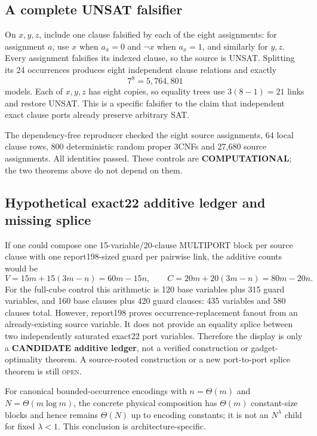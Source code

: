 \documentclass[11pt]{article}
\newcommand{\OPEN}{\textsc{open}}
\begin{document}
\subsection{A complete UNSAT falsifier}
On $x,y,z$, include one clause falsified by each of the eight assignments:
for assignment $a$, use $x$ when $a_x=0$ and $\neg x$ when $a_x=1$, and
similarly for $y,z$.  Every assignment falsifies its indexed clause, so the
source is UNSAT.  Splitting its 24 occurrences produces eight independent
clause relations and exactly
\[
  7^8=5{,}764{,}801
\]
models.  Each of $x,y,z$ has eight copies, so equality trees use
$3(8-1)=21$ links and restore UNSAT.  This is a specific falsifier to the
claim that independent exact clause ports already preserve arbitrary SAT.

The dependency-free reproducer checked the eight source assignments, 64 local
clause rows, 800 deterministic random proper 3CNFs and 27,680 source
assignments.  All identities passed.  These controls are
\textbf{COMPUTATIONAL}; the two theorems above do not depend on them.

\subsection{Hypothetical exact22 additive ledger and missing splice}
If one could compose one 15-variable/20-clause MULTIPORT block per source
clause with one report198-sized guard per pairwise link, the additive counts
would be
\[
 V=15m+15(3m-n)=60m-15n,
 \qquad
 C=20m+20(3m-n)=80m-20n.
\]
For the full-cube control this arithmetic is 120 base variables plus 315 guard
variables, and 160 base clauses plus 420 guard clauses: 435 variables and 580
clauses total.  However, report198 proves occurrence-replacement fanout from
an already-existing source variable.  It does not provide an equality splice
between two independently saturated exact22 port variables.  Therefore the
display is only a \textbf{CANDIDATE additive ledger}, not a verified
construction or gadget-optimality theorem.  A source-rooted construction or a
new port-to-port splice theorem is still \OPEN.

For canonical bounded-occurrence encodings with $n=\Theta(m)$ and
$N=\Theta(m\log m)$, the concrete physical composition has $\Theta(m)$
constant-size blocks and hence remains $\Theta(N)$ up to encoding constants;
it is not an $N^\lambda$ child for fixed $\lambda<1$.  This conclusion is
architecture-specific.
\end{document}

